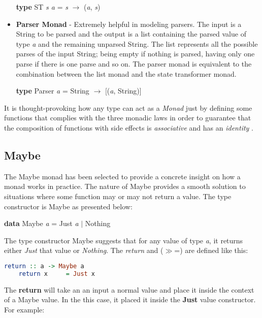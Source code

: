 \documentclass[a4paper, onecolumn]{article}
\begin{document}
\begin{itemize}
    \begin{center}
        \textbf{type} ST \textit{s a} = \textit{s} $\rightarrow$ (\textit{a}, \textit{s})
    \end{center}
    \item \textbf{Parser Monad} - Extremely helpful in modeling parsers. The input is a String to be parsed and the output is a list containing the parsed value of type \textit{a} and the remaining unparsed String. The list represents all the possible parses of the input String; being empty if nothing is parsed, having only one parse if there is one parse and so on. The parser monad is equivalent to the combination between the list monad and the state transformer monad.  
    \begin{center}
        \textbf{type} Parser \textit{a} = String $\rightarrow$ [(\textit{a}, String)] 
    \end{center}
\end{itemize}
It is thought-provoking how any type can act as a \textit{Monad} just by defining some functions that complies with the three monadic laws in order to guarantee that the composition of functions with side effects is \textit{associative} and has an \textit{identity} \cite{essenceFP}.

\subsection{Maybe}
The Maybe monad has been selected to provide a concrete insight on how a monad works in practice. The nature of Maybe provides a smooth solution to situations where some function may or may not return a value. The type constructor is Maybe as presented below:

\begin{center}
    \textbf{data} Maybe \textit{a} = Just \textit{a} $\vert$ Nothing 
\end{center}
The type constructor Maybe suggests that for any value of type \textit{a}, it returns either \textit{Just} that value or \textit{Nothing}. The \textit{return} and ($\gg$=) are defined like this:
\begin{tcolorbox}
\begin{lstlisting}[language=Haskell]
    return :: a -> Maybe a
    return x     = Just x 
\end{lstlisting}
\end{tcolorbox}
The \textbf{return} will take an an input a normal value and place it inside the context of a Maybe value. In the this case, it placed it inside the \textbf{Just} value constructor. For example: 
\end{document}
